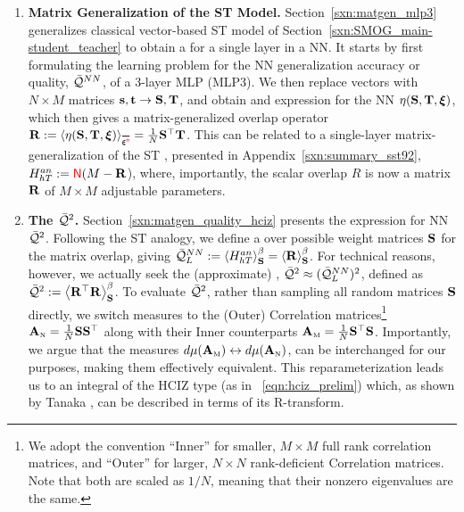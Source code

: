
\begin{enumerate}[label=5.\arabic*]
\item
\textbf{Matrix Generalization of the ST Model.}
Section~\ref{sxn:matgen_mlp3} generalizes
classical \STATMECH vector-based ST model of Section~\ref{sxn:SMOG_main-student_teacher}
to obtain a \LayerQuality for a single layer in a NN.
It starts by first formulating the learning problem for
the NN generalization accuracy or quality, $\bar{\mathcal{Q}}^{NN}$,
of a 3-layer MLP (MLP3).
We then replace vectors with $N \times M$ matrices ${\mathbf{s}},{\mathbf{t}}\rightarrow{\mathbf{S}},{\mathbf{T}}$,
and obtain and expression for the NN \SelfOverlap $\eta({\mathbf{S}},{\mathbf{T}},\boldsymbol{\xi})$,
which then gives a matrix-generalized  overlap operator
$\OVERLAP:=\langle\ETA(\SMAT,\TMAT,\XI)\rangle_{\AVGNDXI}=\tfrac{1}{N}\SMAT^{\top}\TMAT$.
This can be related to a single-layer matrix-generalization of the ST \AnnealedHamiltonian, 
presented in Appendix~\ref{sxn:summary_sst92},
$H^{an}_{hT}:={\color{red}\sf{N}}(M-\mathbf{R}$),
where, importantly, the scalar overlap $R$ is now a matrix $\mathbf{R}$ of $M\times M$ adjustable parameters.

\item
\textbf{The \LayerQualitySquared $\bar{\mathcal{Q}}^{2}$.}
Section~\ref{sxn:matgen_quality_hciz} presents the expression for NN \LayerQualitySquared $\bar{\mathcal{Q}}^{2}$.
Following the ST analogy, we define a \ThermalAverage over possible \Student weight matrices ${\mathbf{S}}$
for the matrix overlap, giving $\bar{\mathcal{Q}}^{NN}_{L}:=\left\langle H^{an}_{hT} \right\rangle_{\mathbf S}^{\beta} =\left\langle \mathbf{R} \right\rangle_{\mathbf S}^{\beta}$.
For technical reasons, however, we actually seek the (approximate)  \LayerQualitySquared, $\bar{\mathcal{Q}}^{2}\approx (\bar{\mathcal{Q}}^{NN}_{L})^2$,
defined as $\bar{\mathcal{Q}}^{2}:=\left\langle {\mathbf{R}}^{\top}\mathbf{R} \right\rangle_{\mathbf S}^{\beta}$.
To evaluate $\bar{\mathcal{Q}}^{2}$, rather than sampling all random \Student matrices ${\mathbf{S}}$ directly,
we switch measures to the (Outer) \Student Correlation matrices\footnote{
We adopt the convention ``Inner'' for smaller, $M\times M$ full rank \Student correlation matrices, and ``Outer'' for larger, $N\times N$ rank-deficient \Student Correlation matrices.
Note that both are scaled as $1 / N$, meaning that their nonzero eigenvalues are the same.
} 
${\mathbf{A}}_{\text{\tiny N}} = \tfrac{1}{N}{\mathbf{S}}{\mathbf{S}}^{\top}$ along with their Inner counterparts
${\mathbf{A}}_{\text{\tiny M}} = \tfrac{1}{N}{\mathbf{S}}^{\top}{\mathbf{S}}$.
Importantly, we argue that the measures $d\mu({\mathbf{A}}_{\text{\tiny M}})\leftrightarrow d\mu({\mathbf{A}}_{\text{\tiny N}})$,
can be interchanged for our purposes, making them effectively equivalent.
This reparameterization leads us to an integral of the HCIZ type (as in \EQN~\ref{eqn:hciz_prelim})
which, as shown by Tanaka \cite{Tanaka2007, Tanaka2008}, can be described in terms of its R-transform.


\end{enumerate}

